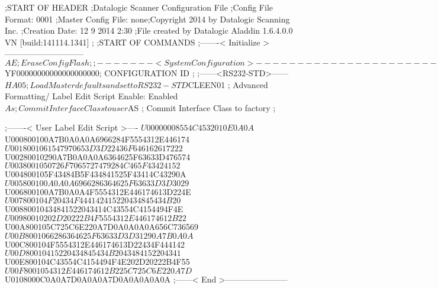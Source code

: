 ;START OF HEADER
;Datalogic Scanner Configuration File
;Config File Format: 0001
;Master Config File: none;Copyright 2014 by Datalogic Scanning Inc.
;Creation Date: 12 9 2014 2:30
;File created by Datalogic Aladdin 1.6.4.0.0 VN [build:141114.1341]
;
;START OF COMMANDS
;-------< Initialize >-----------------------------
$AE                 ; Erase Config Flash
;
;-------< System Configuration >-------------------------------
$YF00000000000000000000; CONFIGURATION ID
;
;------<RS232-STD>------
$HA05               ; Load Master defaults and set to RS232-STD
$CLEEN01            ; Advanced Formatting/ Label Edit Script Enable: Enabled
$As                 ; Commit Interface Class to user
$AS                 ; Commit Interface Class to factory
;

;-------< User Label Edit Script >----
$U00000008554C4532010E0A0A
$U000800100A7B0A0A0A6966284F5554312E446174
$U0018001061547970653D3D22436F646162617222
$U00280010290A7B0A0A0A6364625F63633D476574
$U0038001050726F7065727479284C465F43424152
$U004800105F43484B5F434841525F43414C43290A
$U005800100A0A0A6966286364625F63633D3D3029
$U006800100A7B0A0A4F5554312E446174613D224E
$U007800104F20434F444142415220434845434B20
$U00880010434841522043414C43554C4154494F4E
$U00980010202D20222B4F5554312E446174612B22
$U00A800105C725C6E220A7D0A0A0A0A656C736569
$U00B8001066286364625F63633D3D31290A7B0A0A
$U00C800104F5554312E446174613D22434F444142
$U00D80010415220434845434B2043484152204341
$U00E800104C43554C4154494F4E202D20222B4F55
$U00F8001054312E446174612B225C725C6E220A7D
$U0108000C0A0A7D0A0A0A7D0A0A0A0A0A
;------< End >-----------------------
